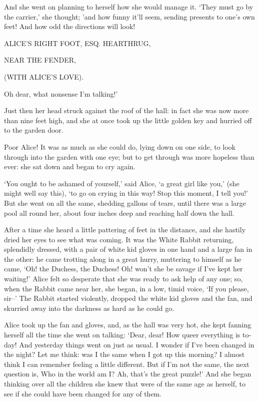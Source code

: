 \documentclass[statementpaper,twoside,openany]{memoir}
\begin{document}
And she went on planning to herself how she would manage it. `They must go by the carrier,' she thought; 'and how funny it'll seem, sending presents to one's own feet! And how odd the directions will look!

ALICE'S RIGHT FOOT, ESQ.
HEARTHRUG,

NEAR THE FENDER,

(WITH ALICE'S LOVE).

Oh dear, what nonsense I'm talking!'

Just then her head struck against the roof of the hall: in fact she was now more than nine feet high, and she at once took up the little golden key and hurried off to the garden door.

Poor Alice! It was as much as she could do, lying down on one side, to look through into the garden with one eye; but to get through was more hopeless than ever: she sat down and began to cry again.

`You ought to be ashamed of yourself,' said Alice, `a great girl like you,' (she might well say this), `to go on crying in this way! Stop this moment, I tell you!' But she went on all the same, shedding gallons of tears, until there was a large pool all round her, about four inches deep and reaching half down the hall.

After a time she heard a little pattering of feet in the distance, and she hastily dried her eyes to see what was coming. It was the White Rabbit returning, splendidly dressed, with a pair of white kid gloves in one hand and a large fan in the other: he came trotting along in a great hurry, muttering to himself as he came, `Oh! the Duchess, the Duchess! Oh! won't she be savage if I've kept her waiting!' Alice felt so desperate that she was ready to ask help of any one; so, when the Rabbit came near her, she began, in a low, timid voice, `If you please, sir--' The Rabbit started violently, dropped the white kid gloves and the fan, and skurried away into the darkness as hard as he could go.

Alice took up the fan and gloves, and, as the hall was very hot, she kept fanning herself all the time she went on talking: `Dear, dear! How queer everything is to-day! And yesterday things went on just as usual. I wonder if I've been changed in the night? Let me think: was I the same when I got up this morning? I almost think I can remember feeling a little different. But if I'm not the same, the next question is, Who in the world am I? Ah, that's the great puzzle!' And she began thinking over all the children she knew that were of the same age as herself, to see if she could have been changed for any of them.
\end{document}
